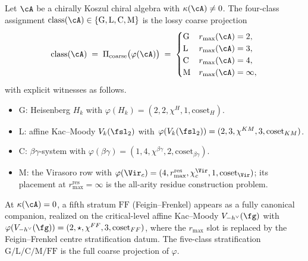 \begin{theorem}
\label{thm:part-ii-quadrichotomy-coarse-projection}
Let $\cA$ be a chirally Koszul chiral algebra with $\kappa(\cA)
\ne 0$. The four-class assignment
$\mathrm{class}(\cA) \in \{\mathrm{G}, \mathrm{L}, \mathrm{C},
\mathrm{M}\}$ is the lossy coarse projection
\begin{equation}
 \mathrm{class}(\cA) \;=\;
 \Pi_{\mathrm{coarse}}\bigl(\varphi(\cA)\bigr)
 \;=\;
 \begin{cases}
 \mathrm{G} & r_{\max}(\cA) = 2, \\
 \mathrm{L} & r_{\max}(\cA) = 3, \\
 \mathrm{C} & r_{\max}(\cA) = 4, \\
 \mathrm{M} & r_{\max}(\cA) = \infty,
 \end{cases}
\end{equation}
with explicit witnesses as follows.
\begin{itemize}
 \item G: Heisenberg $H_k$ with $\varphi(H_k) = (2, 2,
 \chi^H, 1, \mathrm{coset}_H)$.
 \item L: affine Kac--Moody $V_k(\fsl_2)$ with
 $\varphi(V_k(\fsl_2)) = (2, 3, \chi^{KM}, 3, \mathrm{coset}_{KM})$.
 \item C: $\beta\gamma$-system with $\varphi(\beta\gamma) =
 (1, 4, \chi^{\beta\gamma}, 2, \mathrm{coset}_{\beta\gamma})$.
 \item M: the Virasoro row with
 $\varphi(\Vir_c)=(4,r_{\max}^{\mathrm{res}},
 \chi^{\Vir}_c,1,\mathrm{coset}_{\Vir})$; its placement at
 $r_{\max}^{\mathrm{res}}=\infty$ is the all-arity residue
 construction problem.
\end{itemize}
At $\kappa(\cA) = 0$, a fifth stratum $\mathrm{FF}$
\textup{(}Feigin--Frenkel\textup{)} appears as a fully canonical
companion, realized on the critical-level affine Kac--Moody
$V_{-h^\vee}(\fg)$ with
$\varphi(V_{-h^\vee}(\fg)) = (2, \star, \chi^{FF}, 3,
\mathrm{coset}_{FF})$, where the $r_{\max}$ slot is replaced by
the Feigin--Frenkel centre stratification datum. The five-class
stratification $\mathrm{G}/\mathrm{L}/\mathrm{C}/\mathrm{M}/\mathrm{FF}$
is the full coarse projection of $\varphi$.
\end{theorem}

